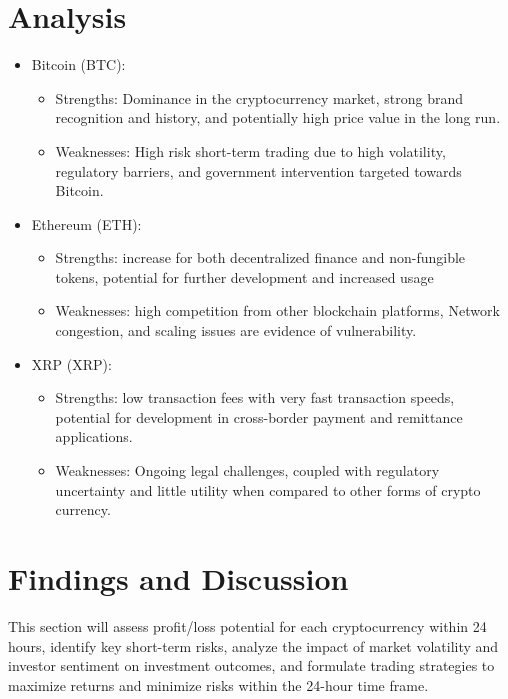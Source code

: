 \documentclass[12pt, a4paper]{article}
\begin{document}
\section{Analysis}
\begin{itemize}
    \item Bitcoin (BTC): 
    \begin{itemize}
        \item Strengths: Dominance in the cryptocurrency market, strong brand recognition and history, and potentially high price value in the long run.
        \item Weaknesses: High risk short-term trading due to high volatility, regulatory barriers, and government intervention targeted towards Bitcoin.
    \end{itemize}

    \item Ethereum (ETH): 
    \begin{itemize}
        \item Strengths: increase for both decentralized finance and non-fungible tokens, potential for further development and increased usage

        \item Weaknesses: high competition from other blockchain platforms, Network congestion, and scaling issues are evidence of vulnerability.
    \end{itemize}

    \item XRP (XRP):
    \begin{itemize}
        \item Strengths: low transaction fees with very fast transaction speeds, potential for development in cross-border payment and remittance applications.

        \item Weaknesses: Ongoing legal challenges, coupled with regulatory uncertainty and little utility when compared to other forms of crypto currency.
    \end{itemize}

\end{itemize}

 \section{Findings and Discussion}
This section will assess profit/loss potential for each cryptocurrency within 24 hours, identify key short-term risks, analyze the impact of market volatility and investor sentiment on investment outcomes, and formulate trading strategies to maximize returns and minimize risks within the 24-hour time frame.
\end{document}
